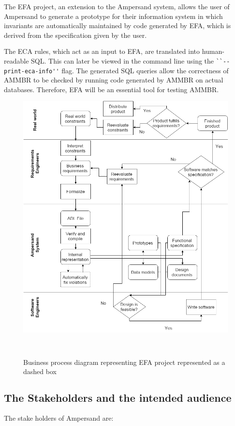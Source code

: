 The EFA project, an extension to the Ampersand system, allows 
the user of Ampersand to generate a prototype for their information
system in which invariants are automatically maintained by code 
generated by EFA, which is derived from the specification given by the user.

The ECA rules, which act as an input to EFA, are translated into human-readable
SQL. This can later be viewed in the command line using the
\verb|``--print-eca-info''| flag.  The generated SQL queries allow the
correctness of AMMBR to be checked by running code generated by AMMBR on actual
databases. Therefore, EFA will be an essential tool for testing AMMBR.

\begin{figure}[!htb]
\begin{center}
\includegraphics[width=\textwidth]{../figures/business_process}
\caption{Business process diagram representing EFA project represented as a dashed box}~\label{fig:EFAproject}
\end{center}
\end{figure}

 \subsection{The Stakeholders and the intended audience}\label{sec:Stakeholders}
The stake holders of Ampersand are:

